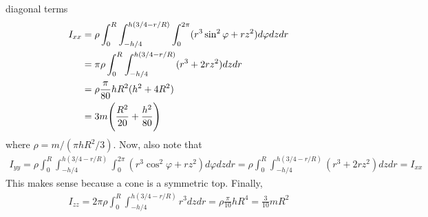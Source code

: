 \documentclass[12pt]{article}
\begin{document}
\begin{problem}{1}
\begin{solution}
diagonal terms
\begin{align}
    I_{xx}
    &=\rho\int_0^R\int_{-h/4}^{h(3/4-r/R)}\int_0^{2\pi}
        (r^3\sin^2\varphi+rz^2)d\varphi
    dzdr\notag\\
    &=\pi\rho\int_0^R\int_{-h/4}^{h(3/4-r/R)}(r^3+2rz^2)dzdr\notag\\
    &=\rho\frac{\pi}{80}hR^2(h^2+4R^2)\notag\\
    &=3m\qty(\frac{R^2}{20}+\frac{h^2}{80})
\end{align}
where $\rho=m /(\pi hR^2 /3)$. Now, also note that
\begin{align}
    I_{yy}=\rho\int_0^R\int_{-h/4}^{h(3/4-r/R)}\int_0^{2\pi}
        (r^3\cos^2\varphi+rz^2)d\varphi dzdr
          =\rho\int_0^R\int_{-h/4}^{h(3/4-r/R)}(r^3+2rz^2)dzdr
          =I_{xx}
\end{align}
This makes sense because a cone is a symmetric top. Finally,
\begin{align}
    I_{zz}
    =2\pi\rho\int_0^R\int_{-h/4}^{h(3/4-r/R)}r^3dzdr
    =\rho\frac{\pi}{10}hR^4
    =\frac3{10}mR^2
\end{align}
\end{solution}
\end{problem}
\end{document}
